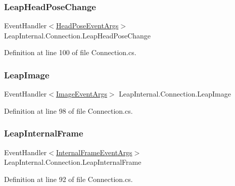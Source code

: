 \subsubsection{\texorpdfstring{LeapHeadPoseChange}{LeapHeadPoseChange}}
{\footnotesize\ttfamily Event\+Handler$<$\mbox{\hyperlink{class_leap_1_1_head_pose_event_args}{Head\+Pose\+Event\+Args}}$>$ Leap\+Internal.\+Connection.\+Leap\+Head\+Pose\+Change}



Definition at line 100 of file Connection.\+cs.

\mbox{\label{class_leap_internal_1_1_connection_a7ff7e1c77a92cba83e8d59e75f8074db}} 
\subsubsection{\texorpdfstring{LeapImage}{LeapImage}}
{\footnotesize\ttfamily Event\+Handler$<$\mbox{\hyperlink{class_leap_1_1_image_event_args}{Image\+Event\+Args}}$>$ Leap\+Internal.\+Connection.\+Leap\+Image}



Definition at line 98 of file Connection.\+cs.

\mbox{\label{class_leap_internal_1_1_connection_acbebf064965d68f74d4e851ee1c22bb1}} 
\subsubsection{\texorpdfstring{LeapInternalFrame}{LeapInternalFrame}}
{\footnotesize\ttfamily Event\+Handler$<$\mbox{\hyperlink{class_leap_1_1_internal_frame_event_args}{Internal\+Frame\+Event\+Args}}$>$ Leap\+Internal.\+Connection.\+Leap\+Internal\+Frame}



Definition at line 92 of file Connection.\+cs.

\mbox{\label{class_leap_internal_1_1_connection_a435f5b54b81790b604a4ef1f9b630d5e}} 
